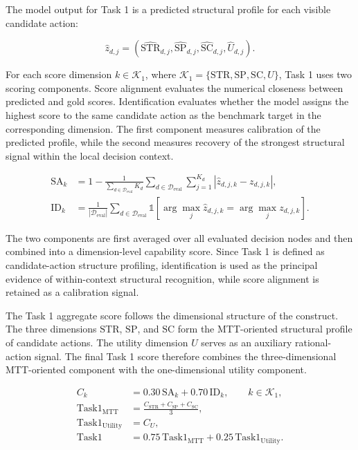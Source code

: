 \documentclass[pdflatex,sn-mathphys-num]{sn-jnl}%
\theoremstyle{thmstyleone}%
\theoremstyle{thmstyletwo}%
\theoremstyle{thmstylethree}%
\begin{document}
The model output for Task 1 is a predicted structural profile for each visible candidate action:

\begin{equation}
\hat{z}_{d,j}=(\widehat{\mathrm{STR}}_{d,j},\widehat{\mathrm{SP}}_{d,j},\widehat{\mathrm{SC}}_{d,j},\widehat{U}_{d,j}).
\end{equation}

For each score dimension $k\in\mathcal{K}_1$, where $\mathcal{K}_1=\{\mathrm{STR},\mathrm{SP},\mathrm{SC},U\}$, Task 1 uses two scoring components. Score alignment evaluates the numerical closeness between predicted and gold scores. Identification evaluates whether the model assigns the highest score to the same candidate action as the benchmark target in the corresponding dimension. The first component measures calibration of the predicted profile, while the second measures recovery of the strongest structural signal within the local decision context.

\begin{align}
\mathrm{SA}_k&=1-\frac{1}{\sum_{d\in\mathcal{D}_{\mathrm{eval}}}K_d}
\sum_{d\in\mathcal{D}_{\mathrm{eval}}}\sum_{j=1}^{K_d}
|\hat{z}_{d,j,k}-z_{d,j,k}|,\\
\mathrm{ID}_k&=\frac{1}{|\mathcal{D}_{\mathrm{eval}}|}
\sum_{d\in\mathcal{D}_{\mathrm{eval}}}
\mathbb{1}\!\left[\arg\max_j\hat{z}_{d,j,k}=\arg\max_j z_{d,j,k}\right].
\end{align}

The two components are first averaged over all evaluated decision nodes and then combined into a dimension-level capability score. Since Task 1 is defined as candidate-action structure profiling, identification is used as the principal evidence of within-context structural recognition, while score alignment is retained as a calibration signal.

The Task 1 aggregate score follows the dimensional structure of the construct. The three dimensions $\mathrm{STR}$, $\mathrm{SP}$, and $\mathrm{SC}$ form the MTT-oriented structural profile of candidate actions. The utility dimension $U$ serves as an auxiliary rational-action signal. The final Task 1 score therefore combines the three-dimensional MTT-oriented component with the one-dimensional utility component.

\begin{align}
C_k&=0.30\,\mathrm{SA}_k+0.70\,\mathrm{ID}_k,\qquad k\in\mathcal{K}_1,\\
\mathrm{Task1}_{\mathrm{MTT}}&=\frac{C_{\mathrm{STR}}+C_{\mathrm{SP}}+C_{\mathrm{SC}}}{3},\\
\mathrm{Task1}_{\mathrm{Utility}}&=C_U,\\
\mathrm{Task1}&=0.75\,\mathrm{Task1}_{\mathrm{MTT}}+0.25\,\mathrm{Task1}_{\mathrm{Utility}}.
\end{align}
\end{document}
